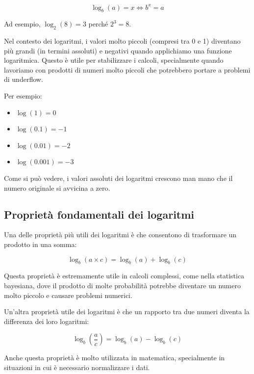 \documentclass[
  italian,
  letterpaper,
  a4paper,
  11pt,
  open=any]{scrbook}
\providecommand{\tightlist}{%
  \setlength{\itemsep}{0pt}\setlength{\parskip}{0pt}}
\theoremstyle{plain}
\theoremstyle{definition}
\theoremstyle{definition}
\theoremstyle{remark}
\begin{document}
\[
\log_b(a) = x \iff b^x = a
\]

Ad esempio, \(\log_2(8) = 3\) perché \(2^3 = 8\).

Nel contesto dei logaritmi, i valori molto piccoli (compresi tra 0 e 1)
diventano più grandi (in termini assoluti) e negativi quando applichiamo
una funzione logaritmica. Questo è utile per stabilizzare i calcoli,
specialmente quando lavoriamo con prodotti di numeri molto piccoli che
potrebbero portare a problemi di underflow.

Per esempio:

\begin{itemize}
\tightlist
\item
  \(\log(1) = 0\)
\item
  \(\log(0.1) = -1\)
\item
  \(\log(0.01) = -2\)
\item
  \(\log(0.001) = -3\)
\end{itemize}

Come si può vedere, i valori assoluti dei logaritmi crescono man mano
che il numero originale si avvicina a zero.

\subsection{Proprietà fondamentali dei
logaritmi}\label{proprietuxe0-fondamentali-dei-logaritmi}

Una delle proprietà più utili dei logaritmi è che consentono di
trasformare un prodotto in una somma:

\[
\log_b(a \times c) = \log_b(a) + \log_b(c)
\]

Questa proprietà è estremamente utile in calcoli complessi, come nella
statistica bayesiana, dove il prodotto di molte probabilità potrebbe
diventare un numero molto piccolo e causare problemi numerici.

Un'altra proprietà utile dei logaritmi è che un rapporto tra due numeri
diventa la differenza dei loro logaritmi:

\[
\log_b\left(\frac{a}{c}\right) = \log_b(a) - \log_b(c)
\]

Anche questa proprietà è molto utilizzata in matematica, specialmente in
situazioni in cui è necessario normalizzare i dati.
\end{document}
